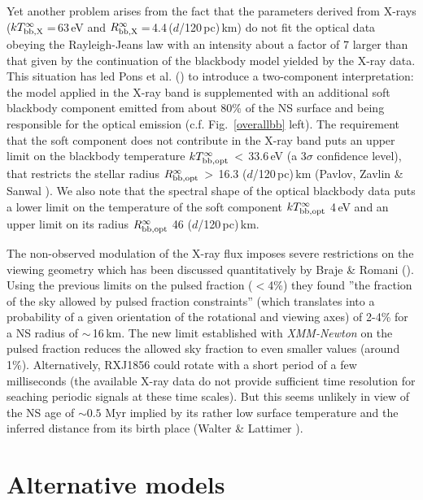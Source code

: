 \documentclass[twocolumn]{aa}
\newcommand{\gapr}{\raisebox{-.6ex}{\mbox{
$\stackrel{>}{\mbox{\scriptsize$\sim$}}\:$}}}
\newcommand{\lapr}{\raisebox{-.6ex}{\mbox{
$\stackrel{<}{\mbox{\scriptsize$\sim$}}\:$}}}
\newcommand{\modi}[1]{{#1}}
\begin{document}
Yet another problem arises from the fact that the parameters 
derived from X-rays ($kT^{\infty}_{\rm bb,X}$\,=\,63\,eV 
and $R^{\infty}_{\rm bb,X}$\,=\,4.4\,($d$/120\,pc)\,km)
do not fit the optical data obeying the Rayleigh-Jeans law 
with an intensity about a factor of 7 larger than that given by the
continuation of the blackbody model yielded by the X-ray data.
This situation has led Pons et al. (\cite{Ponetal02}) to introduce
a two-component interpretation: the model applied in the X-ray band
is supplemented with an additional soft blackbody component
emitted from about 80\% of the NS surface and being responsible for 
the optical emission \modi{(c.f. Fig.~\ref{overallbb} left)}.
The requirement that the soft component does not contribute
in the X-ray band puts an upper  limit on the blackbody temperature 
$kT_{\rm bb,opt}^{\infty}$\,$<$\,33.6\,eV (a 3$\sigma$ confidence level),
that restricts the stellar radius 
$R_{\rm bb,opt}^{\infty}$\,$>$\,16.3 ($d$/120\,pc)\,km
(Pavlov, Zavlin \& Sanwal \cite{PavZavSan02}).
\modi{We also note that the spectral shape of the optical blackbody 
data puts a lower limit on the temperature of the soft component
$kT_{\rm bb,opt}^{\infty}$\,\gapr\,4\,eV 
and an upper limit on its radius
$R_{\rm bb,opt}^{\infty}$\,\lapr\,46 ($d$/120\,pc)\,km.}

The non-observed modulation of the X-ray flux imposes severe 
restrictions on the viewing geometry which has been discussed 
quantitatively by Braje \& Romani (\cite{BraRom02}). 
Using the previous limits on the pulsed fraction ($<$4\%) they 
found ''the fraction of the sky allowed by pulsed fraction 
constraints'' (which translates into a probability of a given 
orientation of the rotational and viewing axes) of 2-4\% for a 
NS radius of $\sim$\,16\,km.
The new limit established with {\em XMM-Newton} on the pulsed 
fraction reduces the allowed sky fraction to even smaller values
(around 1\%).  
Alternatively, RXJ1856 could rotate with a short period of a few
milliseconds (the available X-ray data do not provide sufficient
time resolution for seaching periodic signals at these time scales).
But this seems unlikely in view of the NS age of $\sim0.5$ Myr 
implied by its rather low surface temperature and the inferred 
distance from its birth place (Walter \& Lattimer \cite{WalLat02}).

\section{Alternative models}
\end{document}
